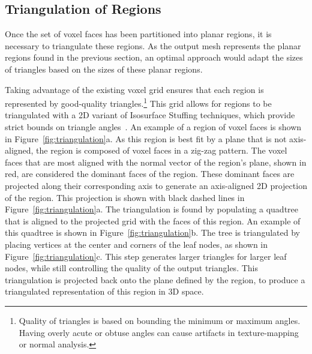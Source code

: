 \documentclass[12pt,onecolumn,oneside]{book}
\begin{document}
\subsection{Triangulation of Regions}
\label{ssec:voxel_triangulation}

Once the set of voxel faces has been partitioned into planar regions, it is necessary to triangulate these regions.  As the output mesh represents the planar regions found in the previous section, an optimal approach would adapt the sizes of triangles based on the sizes of these planar regions.

Taking advantage of the existing voxel grid ensures that each region is represented by good-quality triangles.\footnote{Quality of triangles is based on bounding the minimum or maximum angles.  Having overly acute or obtuse angles can cause artifacts in texture-mapping or normal analysis.}  This grid allows for regions to be triangulated with a 2D variant of Isosurface Stuffing techniques, which provide strict bounds on triangle angles~\cite{Isostuffing}.  An example of a region of voxel faces is shown in Figure~\ref{fig:triangulation}a.  As this region is best fit by a plane that is not axis-aligned, the region is composed of voxel faces in a zig-zag pattern.  The voxel faces that are most aligned with the normal vector of the region's plane, shown in red, are considered the dominant faces of the region.  These dominant faces are projected along their corresponding axis to generate an axis-aligned 2D projection of the region.  This projection is shown with black dashed lines in Figure~\ref{fig:triangulation}a.  The triangulation is found by populating a quadtree that is aligned to the projected grid with the faces of this region.  An example of this quadtree is shown in Figure~\ref{fig:triangulation}b.  The tree is triangulated by placing vertices at the center and corners of the leaf nodes, as shown in Figure~\ref{fig:triangulation}c.  This step generates larger triangles for larger leaf nodes, while still controlling the quality of the output triangles.  This triangulation is projected back onto the plane defined by the region, to produce a triangulated representation of this region in 3D space.
\end{document}
